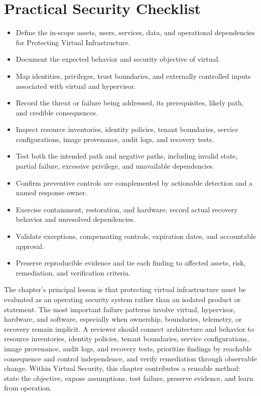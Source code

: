 \documentclass[11pt]{article}
\begin{document}
\section*{Practical Security Checklist}
\begin{itemize}[label=$\square$]
\item Define the in-scope assets, users, services, data, and operational dependencies for Protecting Virtual Infrastructure.
\item Document the expected behavior and security objective of virtual.
\item Map identities, privileges, trust boundaries, and externally controlled inputs associated with virtual and hypervisor.
\item Record the threat or failure being addressed, its prerequisites, likely path, and credible consequences.
\item Inspect resource inventories, identity policies, tenant boundaries, service configurations, image provenance, audit logs, and recovery tests.
\item Test both the intended path and negative paths, including invalid state, partial failure, excessive privilege, and unavailable dependencies.
\item Confirm preventive controls are complemented by actionable detection and a named response owner.
\item Exercise containment, restoration, and hardware; record actual recovery behavior and unresolved dependencies.
\item Validate exceptions, compensating controls, expiration dates, and accountable approval.
\item Preserve reproducible evidence and tie each finding to affected assets, risk, remediation, and verification criteria.
\end{itemize}
\begin{synthesisbox}
The chapter's principal lesson is that protecting virtual infrastructure must be evaluated as an operating security system rather than an isolated product or statement. The most important failure patterns involve virtual, hypervisor, hardware, and software, especially when ownership, boundaries, telemetry, or recovery remain implicit. A reviewer should connect architecture and behavior to resource inventories, identity policies, tenant boundaries, service configurations, image provenance, audit logs, and recovery tests, prioritize findings by reachable consequence and control independence, and verify remediation through observable change. Within Virtual Security, this chapter contributes a reusable method: state the objective, expose assumptions, test failure, preserve evidence, and learn from operation.
\end{synthesisbox}
\end{document}

